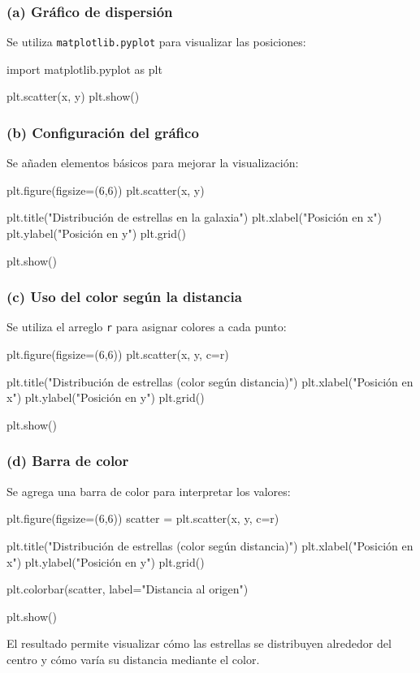 \begin{solution}

\subsubsection*{(a) Gráfico de dispersión}

Se utiliza \texttt{matplotlib.pyplot} para visualizar las posiciones:

\begin{pythonjupyter}
import matplotlib.pyplot as plt

plt.scatter(x, y)
plt.show()
\end{pythonjupyter}

\subsubsection*{(b) Configuración del gráfico}

Se añaden elementos básicos para mejorar la visualización:

\begin{pythonjupyter}
plt.figure(figsize=(6,6))
plt.scatter(x, y)

plt.title("Distribución de estrellas en la galaxia")
plt.xlabel("Posición en x")
plt.ylabel("Posición en y")
plt.grid()

plt.show()
\end{pythonjupyter}

\subsubsection*{(c) Uso del color según la distancia}

Se utiliza el arreglo \texttt{r} para asignar colores a cada punto:

\begin{pythonjupyter}
plt.figure(figsize=(6,6))
plt.scatter(x, y, c=r)

plt.title("Distribución de estrellas (color según distancia)")
plt.xlabel("Posición en x")
plt.ylabel("Posición en y")
plt.grid()

plt.show()
\end{pythonjupyter}

\subsubsection*{(d) Barra de color}

Se agrega una barra de color para interpretar los valores:

\begin{pythonjupyter}
plt.figure(figsize=(6,6))
scatter = plt.scatter(x, y, c=r)

plt.title("Distribución de estrellas (color según distancia)")
plt.xlabel("Posición en x")
plt.ylabel("Posición en y")
plt.grid()

plt.colorbar(scatter, label="Distancia al origen")

plt.show()
\end{pythonjupyter}

El resultado permite visualizar cómo las estrellas se distribuyen alrededor del centro y cómo varía su distancia mediante el color.

\end{solution}
